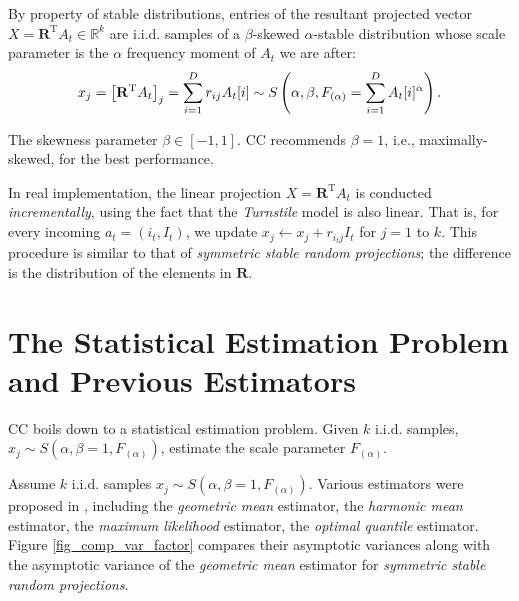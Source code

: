 \documentclass[oneside,10pt]{article}
\begin{document}
By property of stable distributions\cite{Book:Zolotarev_86,Book:Samorodnitsky_94}, entries of the resultant projected vector $X = \mathbf{R}^\text{T}A_t\in\mathbb{R}^{k}$ are i.i.d. samples of a $\beta$-skewed $\alpha$-stable distribution whose scale parameter is the $\alpha$ frequency moment of $A_t$ we are after:
\begin{align}\notag
x_j = \left[\mathbf{R}^\text{T} A_t\right]_j = \sum_{i=1}^D r_{ij} A_t[i] \sim S\left(\alpha, \beta, F_{(\alpha)} = \sum_{i=1}^D A_t[i]^\alpha\right).
\end{align}

The skewness parameter $\beta \in[-1,1]$. CC recommends  $\beta = 1$, i.e., maximally-skewed, for the best performance.

In real implementation, the linear projection $X = \mathbf{R}^\text{T} A_t$ is conducted {\em incrementally}, using the fact that the {\em Turnstile} model is also linear. That is, for every incoming $a_t = (i_t, I_t)$, we update $x_j \leftarrow x_j + r_{i_tj} I_t$ for $j = 1$ to $k$.   This procedure is similar to that of {\em symmetric stable random projections}\cite{Article:Indyk_JACM06,Proc:Li_SODA08}; the difference is the distribution of the elements in $\mathbf{R}$.

\section{The Statistical Estimation Problem and Previous Estimators}

CC boils down to a statistical estimation problem. Given $k$ i.i.d. samples, $x_j \sim S\left(\alpha, \beta =1, F_{(\alpha)}\right)$, estimate the scale parameter $F_{(\alpha)}$.

Assume $k$ i.i.d. samples $x_j \sim S\left(\alpha, \beta=1, F_{(\alpha)}\right)$. Various estimators were proposed in \cite{Article:Li_CC,Article:Li_CC_v0}, including the {\em geometric mean} estimator, the {\em harmonic mean} estimator, the {\em maximum likelihood} estimator, the {\em optimal quantile} estimator. Figure \ref{fig_comp_var_factor} compares their asymptotic variances along with the asymptotic variance of the {\em geometric mean} estimator for {\em symmetric stable random projections}\cite{Proc:Li_SODA08}.
\end{document}
